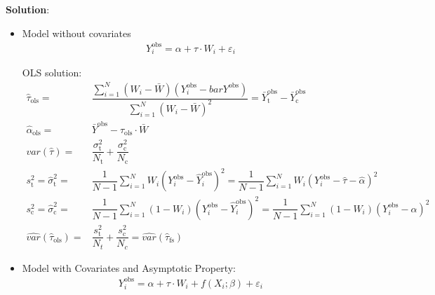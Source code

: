 \textbf{Solution}:
\begin{itemize}[topsep=2pt,itemsep=0pt]
    \item Model without covariates
    \begin{align}
        Y_i^\mathrm{obs} = \alpha +\tau\cdot W_i+\varepsilon _i  
    \end{align}

    OLS solution:
    \begin{align}
        \hat{\tau}_\mathrm{ols} =&\dfrac{\sum_{i=1}^N(W_i-\bar{W})(Y_i^\mathrm{obs}-bar{Y}^\mathrm{obs}  )}{\sum_{i=1}^N(W_i-\bar{W})^2}=\bar{Y}^\mathrm{obs}_\mathrm{t}-\bar{Y}^\mathrm{obs}_\mathrm{c}   \\
        \hat{\alpha }_\mathrm{ols} =&\bar{Y}^\mathrm{obs}-\hat{\tau}_\mathrm{ols} \cdot\bar{W}  \\
        var(\hat{\tau})=&\dfrac{\sigma _\mathrm{t}^2 }{N_\mathrm{t} }+\dfrac{\sigma _\mathrm{c}^2 }{N_\mathrm{c} }\\
        s^2_\mathrm{t}= \hat{\sigma }_\mathrm{t}^2=&\dfrac{1}{N-1}\sum_{i=1}^NW_i\left(Y_i^\mathrm{obs}-\hat{Y}_i^\mathrm{obs}  \right)^2=\dfrac{1}{N-1}\sum_{i=1}^NW_i\left(Y_i^\mathrm{obs}-\hat{\tau}-\hat{\alpha } \right)^2\\
        s_\mathrm{c}^2= \hat{\sigma }_\mathrm{c}^2=&\dfrac{1}{N-1}\sum_{i=1}^N(1-W_i)\left(Y_i^\mathrm{obs}-\hat{Y}_i^\mathrm{obs}  \right)^2=\dfrac{1}{N-1}\sum_{i=1}^N(1-W_i)\left(Y_i^\mathrm{obs}-\hat{\alpha } \right)^2\\
        \hat{var}(\hat{\tau}_\mathrm{ols} )=&\dfrac{s_\mathrm{t}^2 }{N_t}+\dfrac{s_\mathrm{c}^2 }{N_c}=\hat{var}(\hat{\tau}_\mathrm{fs} )
    \end{align}
    
    \item Model with Covariates and Asymptotic Property:
    \begin{align}
        Y_i^\mathrm{obs} = \alpha +\tau\cdot W_i +f(X_i;\beta)  +\varepsilon _i 
    \end{align}


\end{itemize}
